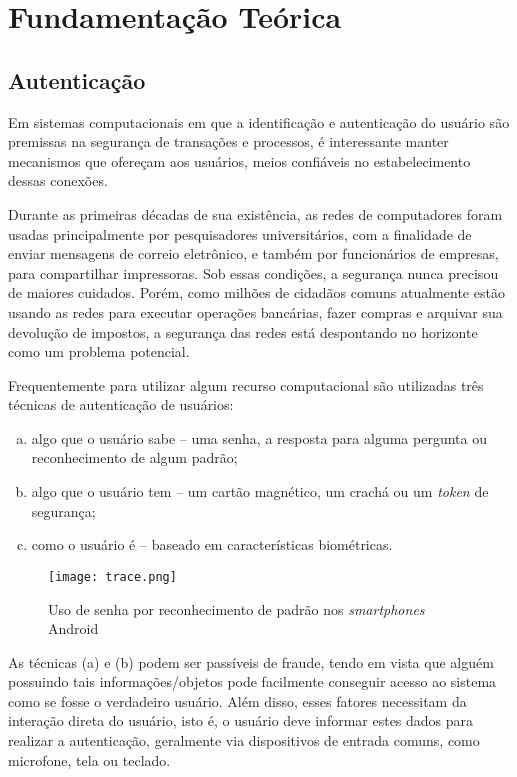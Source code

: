 \chapter{Fundamentação Teórica}
\section{Autenticação}
Em sistemas computacionais em que a identificação e autenticação do usuário são premissas na segurança de transações e processos, é interessante manter mecanismos que ofereçam aos usuários, meios confiáveis no estabelecimento dessas conexões.
\begin{citacao}
Durante as primeiras décadas de sua existência, as redes de computadores foram usadas principalmente por pesquisadores universitários, com a finalidade de enviar mensagens de correio eletrônico, e também por funcionários de empresas, para compartilhar impressoras. Sob essas condições, a segurança nunca precisou de maiores cuidados. Porém, como milhões de cidadãos comuns atualmente estão usando as redes para executar operações bancárias, fazer compras e arquivar sua devolução de impostos, a segurança das redes está despontando no horizonte como um problema potencial.\cite{tanenbaum2011computer}
\end{citacao}
Frequentemente para utilizar algum recurso computacional são utilizadas três técnicas de autenticação de usuários:
\begin{enumerate}[(a)]
\item algo que o usuário sabe – uma senha, a resposta para alguma pergunta ou reconhecimento de algum padrão;
\item algo que o usuário tem – um cartão magnético, um crachá ou um \textit{token} de segurança;
\item como o usuário é – baseado em características biométricas.
\end{enumerate}

\begin{figure}[!htb]
	\centering
	\texttt{[image: trace.png]} %
	\small
	\caption[Uso de senha por reconhecimento de padrão]{Uso de senha por reconhecimento de padrão nos \textit{smartphones} Android}
	\label{fig:trace}
\end{figure}

As técnicas (a) e (b) podem ser passíveis de fraude, tendo em vista que alguém possuindo tais informações/objetos pode facilmente conseguir acesso ao sistema como se fosse o verdadeiro usuário. Além disso, esses fatores necessitam da interação direta do usuário, isto é, o usuário deve informar estes dados para realizar a autenticação, geralmente via dispositivos de entrada comuns, como microfone, tela ou teclado.

